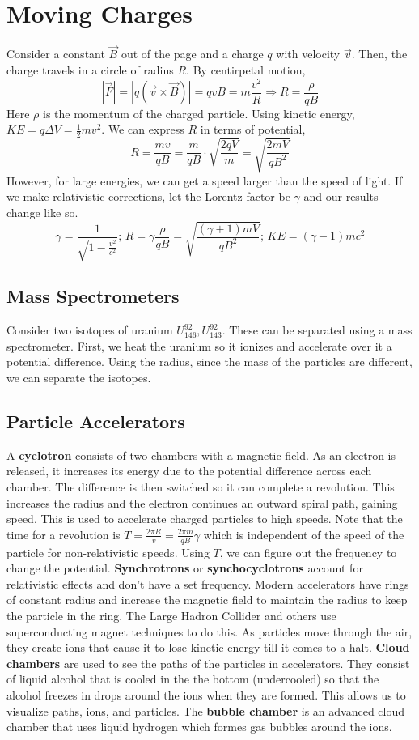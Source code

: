 \documentclass{article}
\begin{document}
\section{Moving Charges}
Consider a constant $\vec{B}$ out of the page and a charge $q$ with velocity $\vec{v}$.
Then, the charge travels in a circle of radius $R$. By centirpetal motion,
$$|\vec{F}|=|q(\vec{v}\times\vec{B})|=qvB=m\frac{v^{2}}{R}\Rightarrow \boxed{R=\frac{\rho}{qB}}$$
Here $\rho$ is the momentum of the charged particle. Using kinetic energy, $KE=q\Delta V=\frac{1}{2}mv^{2}$.
We can express $R$ in terms of potential,
$$R=\frac{mv}{qB}=\frac{m}{qB}\cdot \sqrt{\frac{2qV}{m}}=\sqrt{\frac{2mV}{qB^{2}}}$$
However, for large energies, we can get a speed larger than the speed of light. 
If we make relativistic corrections, let the Lorentz factor be $\gamma$ and our results change like so.
$$\gamma=\frac{1}{\sqrt{1-\frac{v^2}{c^2}}};\,
R=\gamma\frac{\rho}{qB}=\sqrt{\frac{(\gamma +1)mV}{qB^{2}}};\,
KE=(\gamma-1)mc^{2}$$

\subsection{Mass Spectrometers}
Consider two isotopes of uranium $U^{92}_{146},U^{92}_{143}$. These can be separated using a mass spectrometer.
First, we heat the uranium so it ionizes and accelerate over it a potential difference. 
Using the radius, since the mass of the particles are different, we can separate the isotopes.

\subsection{Particle Accelerators}
A \textbf{cyclotron} consists of two chambers with a magnetic field. As an electron is released, it increases its energy 
due to the potential difference across each chamber. The difference is then switched so it can complete a revolution.
This increases the radius and the electron continues an outward
spiral path, gaining speed. This is used to accelerate charged particles to high speeds.
Note that the time for a revolution is $T=\frac{2\pi R}{v}=\frac{2\pi m}{qB}\gamma$ which is independent of the speed
of the particle for non-relativistic speeds. Using $T$, we can figure out the frequency to change the potential. \textbf{Synchrotrons}
or \textbf{synchocyclotrons} account for relativistic effects and don't have a set frequency.
Modern accelerators have rings of constant radius and increase the magnetic field to maintain the radius to keep the particle in the ring.
The Large Hadron Collider and others use superconducting magnet techniques to do this. As particles move through the air, they create ions that cause it to lose 
kinetic energy till it comes to a halt. \textbf{Cloud chambers} are used to see the paths of the particles in accelerators.
They consist of liquid alcohol that is cooled in the the bottom (undercooled) so that the alcohol freezes in drops around the ions when they are 
formed. This allows us to visualize paths, ions, and particles. The \textbf{bubble chamber} is an advanced cloud chamber that uses
liquid hydrogen which formes gas bubbles around the ions.
\end{document}
